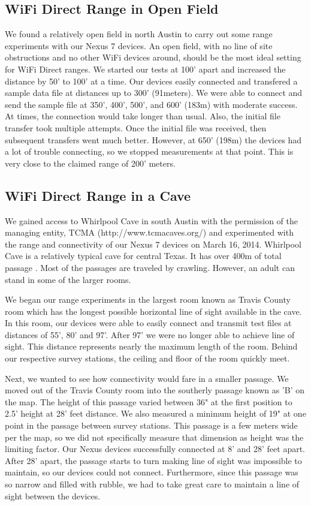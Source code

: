 \documentclass[10pt,twocolumn]{article}
\begin{document}
\subsection{WiFi Direct Range in Open Field}
\label{sec:WiFi Direct Range in Open Field}
We found a relatively open field in north Austin to carry out some range experiments with our Nexus 7 devices.
An open field, with no line of site obstructions and no other WiFi devices around, should be the most ideal setting for WiFi Direct ranges.
We started our tests at 100' apart and increased the distance by 50' to 100' at a time.
Our devices easily connected and transfered a sample data file at distances up to 300' (91meters). 
We were able to connect and send the sample file at 350', 400', 500', and 600' (183m) with moderate success. 
At times, the connection would take longer than usual.
Also, the initial file transfer took multiple attempts.
Once the initial file was received, then subsequent transfers went much better.
However, at 650' (198m) the devices had a lot of trouble connecting, so we stopped measurements at that point.
This is very close to the claimed range of 200' meters.

\subsection{WiFi Direct Range in a Cave}
\label{sec:WiFi Direct Range in a Cave}
We gained access to Whirlpool Cave in south Austin with the permission of the managing entity, TCMA (http://www.tcmacaves.org/) and experimented with the range and connectivity of our Nexus 7 devices on March 16, 2014.
Whirlpool Cave is a relatively typical cave for central Texas.
It has over 400m of total passage \cite{whirlpool}. 
Most of the passages are traveled by crawling.
However, an adult can stand in some of the larger rooms.

We began our range experiments in the largest room known as Travis County room which has the longest possible horizontal line of sight available in the cave.
In this room, our devices were able to easily connect and transmit test files at distances of 55', 80' and 97'. 
After 97' we were no longer able to achieve line of sight.
This distance represents nearly the maximum length of the room. 
Behind our respective survey stations, the ceiling and floor of the room quickly meet.

Next, we wanted to see how connectivity would fare in a smaller passage. 
We moved out of the Travis County room into the southerly passage known as 'B' on the map.
The height of this passage varied between 36" at the first position to 2.5' height at 28' feet distance.
We also measured a minimum height of 19" at one point in the passage between survey stations.
This passage is a few meters wide per the map, so we did not specifically measure that dimension as height was the limiting factor.
Our Nexus devices successfully connected at 8' and 28' feet apart.
After 28' apart, the passage starts to turn making line of sight was impossible to maintain, so our devices could not connect.
Furthermore, since this passage was so narrow and filled with rubble, we had to take great care to maintain a line of sight between the devices.
\end{document}
